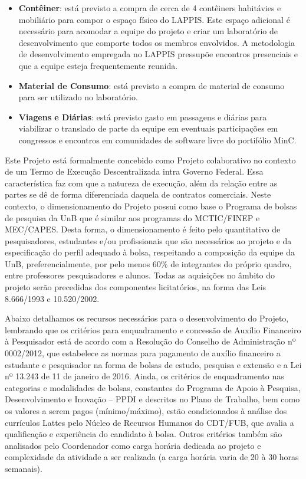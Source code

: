 \begin{itemize}
\item \textbf{Contêiner}: está previsto a compra de cerca de 4 contêiners habitávies e mobiliário 
  para compor o espaço físico do LAPPIS. Este espaço adicional é necessário para
  acomodar a equipe do projeto e criar um laboratório de desenvolvimento que 
  comporte todos os membros envolvidos. A metodologia de desenvolvimento empregada
  no LAPPIS pressupõe encontros presenciais e que a equipe esteja frequentemente
  reunida.
\item \textbf{Material de Consumo}: está previsto a compra de material de 
  consumo para ser utilizado no laboratório.
\item \textbf{Viagens e Diárias}: está previsto gasto em passagens e diárias 
  para viabilizar o translado de parte da equipe em eventuais participações em 
  congressos e encontros em comunidades de software livre do portifólio MinC. 
\end{itemize}

Este Projeto está formalmente concebido como Projeto colaborativo no contexto de um Termo de Execução Descentralizada intra Governo Federal.
Essa característica faz com que a natureza de execução, além da relação entre as partes se dê de forma diferenciada daquela de contratos comerciais.
Neste contexto, o dimensionamento do Projeto possui como base o Programa de bolsas de pesquisa da UnB que é similar aos programas do MCTIC/FINEP  e
MEC/CAPES. Desta forma, o dimensionamento é feito pelo quantitativo de pesquisadores, estudantes e/ou profissionais que são necessários ao projeto e 
da especificação do perfil adequado à bolsa, respeitando a composição da equipe da UnB, preferencialmente, por pelo menos 60\% 
de integrantes do próprio quadro, entre professores pesquisadores e alunos. Todas as aquisições no âmbito do projeto serão precedidas dos componentes
licitatórios, na forma das Leis 8.666/1993 e 10.520/2002.
 
Abaixo detalhamos os recursos necessários para o desenvolvimento do Projeto, lembrando que os critérios para enquadramento e concessão de
Auxílio Financeiro à Pesquisador está de acordo com a Resolução do Conselho de Administração nº 0002/2012, que estabelece as normas para
pagamento de auxílio financeiro a estudante e pesquisador na forma de bolsas de estudo, pesquisa e extensão e a Lei nº 13.243 de 11 de janeiro de 2016.
Ainda, os critérios de enquadramento nas categorias e modalidades de bolsas, constantes do Programa de Apoio à Pesquisa, Desenvolvimento e Inovação 
– PPDI e descritos no Plano de Trabalho, bem como os valores a serem pagos (mínimo/máximo), estão condicionados à análise dos currículos Lattes 
pelo Núcleo de Recursos Humanos do CDT/FUB, que avalia a qualificação e experiência do candidato à bolsa. Outros critérios também são analisados 
pelo Coordenador como carga horária dedicada ao projeto e complexidade da atividade a ser realizada (a carga horária varia de 20 à 30 horas semanais).
 
